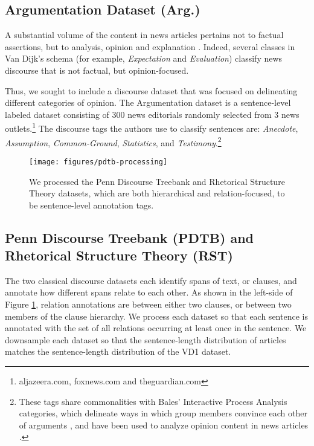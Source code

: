 \documentclass[11pt]{article}
\newcommand\nd{VD1\xspace}
\newcommand\argumentation{Arg.\xspace}
\begin{document}
\subsection{Argumentation Dataset (\argumentation)}

A substantial volume of the content in news articles pertains not to factual assertions, but to analysis, opinion and explanation \cite{steele1996journalism}. Indeed, several classes in Van Dijk's schema (for example, \textit{Expectation} and \textit{Evaluation}) classify news discourse that is not factual, but opinion-focused.

Thus, we sought to include a discourse dataset that was focused on delineating different categories of opinion. The Argumentation dataset \cite{al2016news} is a sentence-level labeled dataset consisting of $300$ news editorials randomly selected from 3 news outlets.\footnote{aljazeera.com, foxnews.com and theguardian.com} The discourse tags the authors use to classify sentences are: \textit{Anecdote}, \textit{Assumption}, \textit{Common-Ground}, \textit{Statistics}, and \textit{Testimony}.\footnote{These tags share commonalities with Bales' Interactive Process Analysis categories, which delineate ways in which group members convince each other of arguments \cite{bales1950interaction, bales1970personality}, and have been used to analyze opinion content in news articles \cite{steele1996journalism}.}

\begin{figure}[t]
    \centering
    \texttt{[image: figures/pdtb-processing]}
    \caption{We processed the Penn Discourse Treebank and Rhetorical Structure Theory datasets, which are both hierarchical and relation-focused, to be sentence-level annotation tags.}
    \label{fig:pdtb_processing}
\end{figure}

\subsection{Penn Discourse Treebank (PDTB) and Rhetorical Structure Theory (RST)} 
\label{sec:pdtb_rst}
The two classical discourse datasets each identify spans of text, or clauses, and annotate how different spans relate to each other. As shown in the left-side of Figure \ref{fig:pdtb_processing}, relation annotations are between either two clauses, or between two members of the clause hierarchy. We process each dataset so that each sentence is annotated with the set of all relations occurring at least once in the sentence. We downsample each dataset so that the sentence-length distribution of articles matches the sentence-length distribution of the \nd dataset.
\end{document}
